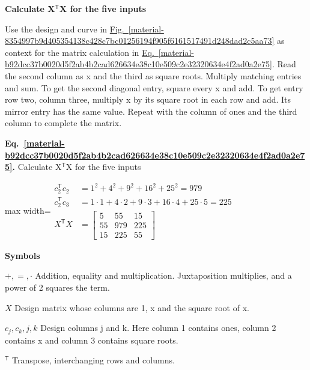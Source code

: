 \documentclass[11pt,a4paper]{article}
\begin{document}
\textbf{Calculate X\ensuremath{{}^{\mathsf T}}X for the five inputs}


Use the design and curve in \hyperref[material-8354997b9d405354138c428c7bc01256194f905f6161517491d248dad2c5aa73]{Fig.~\ref*{material-8354997b9d405354138c428c7bc01256194f905f6161517491d248dad2c5aa73}} as context for the matrix calculation in \hyperref[material-b92dcc37b0020d5f2ab4b2cad626634e38c10e509c2e32320634e4f2ad0a2e75]{Eq.~\ref*{material-b92dcc37b0020d5f2ab4b2cad626634e38c10e509c2e32320634e4f2ad0a2e75}}. Read the second column as x and the third as square roots. Multiply matching entries and sum. To get the second diagonal entry, square every x and add. To get entry row two, column three, multiply x by its square root in each row and add. Its mirror entry has the same value. Repeat with the column of ones and the third column to complete the matrix.


\par\medskip
\noindent\begin{minipage}{\linewidth}
\label{material-b92dcc37b0020d5f2ab4b2cad626634e38c10e509c2e32320634e4f2ad0a2e75}
\noindent\textbf{Eq.~\ref*{material-b92dcc37b0020d5f2ab4b2cad626634e38c10e509c2e32320634e4f2ad0a2e75}.} Calculate X\ensuremath{{}^{\mathsf T}}X for the five inputs\par\nopagebreak
\begin{center}\begin{adjustbox}{max width=\linewidth}$\displaystyle \begin{aligned}c_2^{\mathsf T}c_2&=1^2+4^2+9^2+16^2+25^2=979\\[.35em]c_2^{\mathsf T}c_3&=1\cdot1+4\cdot2+9\cdot3+16\cdot4+25\cdot5=225\\[.5em]X^{\mathsf T}X&=\begin{bmatrix}5&55&15\\55&979&225\\15&225&55\end{bmatrix}\end{aligned}$\end{adjustbox}\end{center}

\par\noindent\textbf{Symbols}

\par\noindent\textbf{\(+,=,\cdot\)} Addition, equality and multiplication. Juxtaposition multiplies, and a power of 2 squares the term.

\par\noindent\textbf{\(X\)} Design matrix whose columns are 1, x and the square root of x.

\par\noindent\textbf{\(c_j,c_k,j,k\)} Design columns j and k. Here column 1 contains ones, column 2 contains x and column 3 contains square roots.

\par\noindent\textbf{\({}^{\mathsf T}\)} Transpose, interchanging rows and columns.

\end{minipage}\par
\medskip
\end{document}
